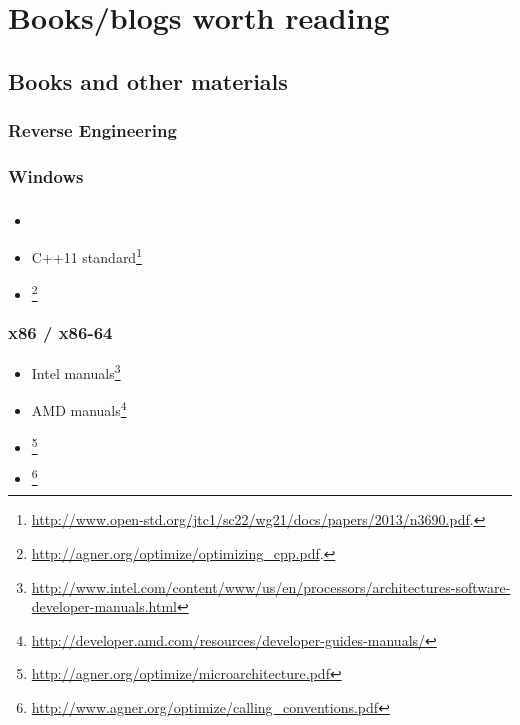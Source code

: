 \part{Books/blogs worth reading}

\chapter{Books and other materials}

\section{Reverse Engineering}



\section{Windows}



\section{\CCpp}

\begin{itemize}
\item \KRBook

\item C++11 standard\footnote{\AlsoAvailableAs \url{http://www.open-std.org/jtc1/sc22/wg21/docs/papers/2013/n3690.pdf}.}

\item [\AgnerFogCCP]\footnote{\AlsoAvailableAs \url{http://agner.org/optimize/optimizing_cpp.pdf}.}
\end{itemize}

\section{x86 / x86-64}

\label{x86_manuals}
\begin{itemize}
\item Intel manuals\footnote{\AlsoAvailableAs \url{http://www.intel.com/content/www/us/en/processors/architectures-software-developer-manuals.html}}

\item AMD manuals\footnote{\AlsoAvailableAs \url{http://developer.amd.com/resources/developer-guides-manuals/}}

\item \AgnerFog{}\footnote{\AlsoAvailableAs \url{http://agner.org/optimize/microarchitecture.pdf}}

\item \AgnerFogCC{}\footnote{\AlsoAvailableAs \url{http://www.agner.org/optimize/calling_conventions.pdf}}
\end{itemize}

